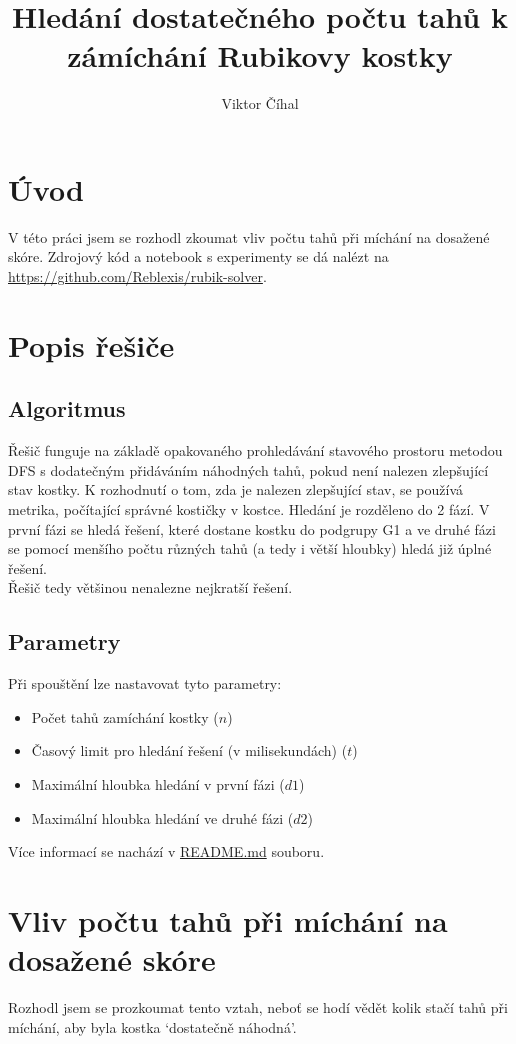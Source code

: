 \documentclass{article}
\title{Hledání dostatečného počtu tahů k zámíchání Rubikovy kostky}
\author{Viktor Číhal}
\date{}
\begin{document}
\maketitle
\section*{Úvod}
V této práci jsem se rozhodl zkoumat vliv počtu tahů při míchání na dosažené skóre.
Zdrojový kód a notebook s experimenty se dá nalézt na \url{https://github.com/Reblexis/rubik-solver}.

\section*{Popis řešiče}
\subsection*{Algoritmus}
Řešič funguje na základě opakovaného prohledávání stavového prostoru metodou DFS
s dodatečným přidáváním náhodných tahů, pokud není nalezen zlepšující stav kostky.
K rozhodnutí o tom, zda je nalezen zlepšující stav, se používá metrika, počítající
správné kostičky v kostce. Hledání je rozděleno do 2 fází. V první fázi se hledá
řešení, které dostane kostku do podgrupy G1 a ve druhé fázi se pomocí menšího počtu
různých tahů (a tedy i větší hloubky) hledá již úplné řešení.\\
Řešič tedy většinou nenalezne nejkratší řešení.

\subsection*{Parametry}
Při spouštění lze nastavovat tyto parametry:
\begin{itemize}
    \item Počet tahů zamíchání kostky ($n$)
    \item Časový limit pro hledání řešení (v milisekundách) ($t$)
    \item Maximální hloubka hledání v první fázi ($d1$)
    \item Maximální hloubka hledání ve druhé fázi ($d2$)
\end{itemize}

Více informací se nachází v \href{https://github.com/Reblexis/rubik-solver/blob/main/README.md}{README.md} souboru.

\section*{Vliv počtu tahů při míchání na dosažené skóre}
Rozhodl jsem se prozkoumat tento vztah, neboť se hodí vědět kolik stačí tahů při míchání, aby byla kostka
`dostatečně náhodná'. \\
\end{document}
